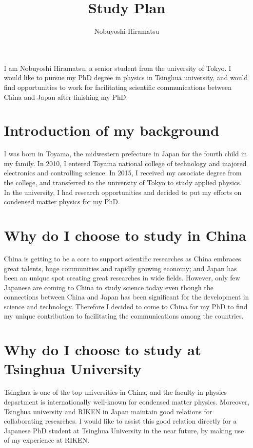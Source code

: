 \documentclass[aps,prb,reprint]{revtex4-1}
\begin{document}
\title{Study Plan}
\author{Nobuyoshi Hiramatsu}
\maketitle

I am Nobuyoshi Hiramatsu, a senior student from the university of Tokyo. I would like to pursue my PhD degree in physics in Tsinghua university, and would find opportunities to work for facilitating scientific communications between China and Japan after finishing my PhD.

\section{Introduction of my background}
I was born in Toyama, the midwestern prefecture in Japan for the fourth child in my family.  In 2010, I entered Toyama national college of technology and majored electronics and controlling science. In 2015, I received my associate degree from the college, and transferred to the university of Tokyo to study applied physics. In the university, I had research opportunities and decided to put my efforts on condensed matter physics for my PhD. 
 
\section{Why do I choose to study in China}
China is getting to be a core to support scientific researches as China embraces great talents, huge communities and rapidly growing economy; and Japan has been an unique spot creating great researches in wide fields. However, only few Japanese are coming to China to study science today even though the connections between China and Japan has been significant for the development in science and technology. Therefore I decided to come to China for my PhD to find my unique contribution to facilitating the communications among the countries.

\section{Why do I choose to study at Tsinghua University}
Tsinghua is one of the top universities in China, and the faculty in physics department is internationally well-known for condensed matter physics.  Moreover, Tsinghua university and RIKEN in Japan maintain good relations for collaborating researches. I would like to assist this good relation directly for a Japanese PhD student at Tsinghua University in the near future, by making use of my experience at RIKEN. 
\end{document}
